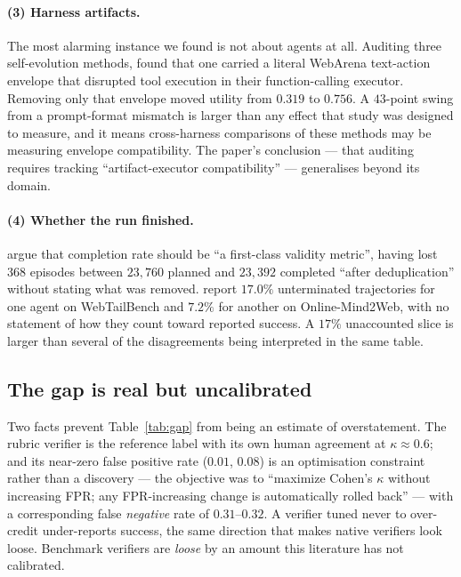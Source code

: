 \documentclass[10pt,twocolumn,a4paper]{article}
\begin{document}
\paragraph{(3) Harness artifacts.}
The most alarming instance we found is not about agents at all.
Auditing three self-evolution methods,
\citet{li2026auditingselfevolutionfinancialagents} found that one carried a literal
WebArena text-action envelope that disrupted tool execution in their function-calling
executor.
Removing only that envelope moved utility from $0.319$ to $0.756$.
A $43$-point swing from a prompt-format mismatch is larger than any effect that study was
designed to measure, and it means cross-harness comparisons of these methods may be
measuring envelope compatibility.
The paper's conclusion --- that auditing requires tracking ``artifact-executor
compatibility'' --- generalises beyond its domain.

\paragraph{(4) Whether the run finished.}
\citet{khanal2026pass1reliabilityscienceframework} argue that completion rate should be
``a first-class validity metric'', having lost $368$ episodes between $23{,}760$ planned and
$23{,}392$ completed ``after deduplication'' without stating what was removed.
\citet{rosset2026artbuildingverifierscomputer} report $17.0\%$ unterminated trajectories
for one agent on WebTailBench and $7.2\%$ for another on Online-Mind2Web, with no statement
of how they count toward reported success.
A $17\%$ unaccounted slice is larger than several of the disagreements being interpreted in
the same table.

\subsection{The gap is real but uncalibrated}
\label{sec:calib}

Two facts prevent Table~\ref{tab:gap} from being an estimate of overstatement.
The rubric verifier is the reference label with its own human agreement at
$\kappa \approx 0.6$; and its near-zero false positive rate ($0.01$, $0.08$) is an
optimisation constraint rather than a discovery --- the objective was to ``maximize Cohen's
$\kappa$ without increasing FPR; any FPR-increasing change is automatically rolled back'' ---
with a corresponding false \emph{negative} rate of $0.31$--$0.32$.
A verifier tuned never to over-credit under-reports success, the same direction that makes
native verifiers look loose.
Benchmark verifiers are \emph{loose} by an amount this literature has not calibrated.
\end{document}
